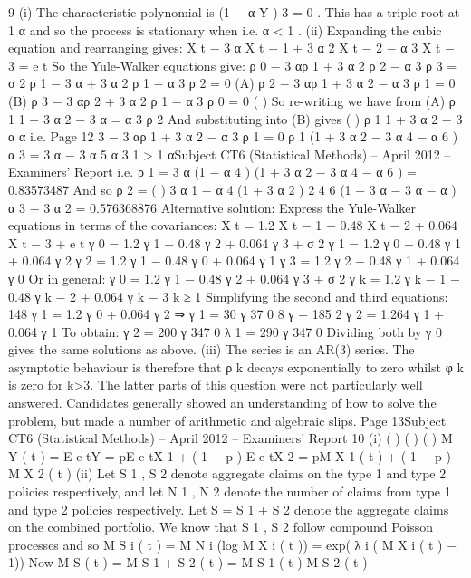 \documentclass[a4paper,12pt]{article}
\begin{document}
\begin{enumerate}
9
(i)
The characteristic polynomial is (1 − α Y ) 3 = 0 .
This has a triple root at 1
α
and so the process is stationary when
i.e. α < 1 .
(ii)
Expanding the cubic equation and rearranging gives:
X t − 3 α X t − 1 + 3 α 2 X t − 2 − α 3 X t − 3 = e t
So the Yule-Walker equations give:
ρ 0 − 3 αρ 1 + 3 α 2 ρ 2 − α 3 ρ 3 = σ 2
ρ 1 − 3 α + 3 α 2 ρ 1 − α 3 ρ 2 = 0 (A)
ρ 2 − 3 αρ 1 + 3 α 2 − α 3 ρ 1 = 0 (B)
ρ 3 − 3 αρ 2 + 3 α 2 ρ 1 − α 3 ρ 0 = 0
(
)
So re-writing we have from (A) ρ 1 1 + 3 α 2 − 3 α = α 3 ρ 2
And substituting into (B) gives
(
)
ρ 1 1 + 3 α 2 − 3 α
α
i.e.
Page 12
3
− 3 αρ 1 + 3 α 2 − α 3 ρ 1 = 0
ρ 1 (1 + 3 α 2 − 3 α 4 − α 6 )
α 3
=
3 α − 3 α 5
α 3
1
> 1
αSubject CT6 (Statistical Methods) – April 2012 – Examiners’ Report
i.e.
ρ 1 =
3 α (1 − α 4 )
(1 + 3 α 2 − 3 α 4 − α 6 )
= 0.83573487
And so
ρ 2 =
(
)
3 α 1 − α 4 (1 + 3 α 2 )
2
4
6
(1 + 3 α − 3 α − α ) α
3
−
3
α 2
= 0.576368876
Alternative solution:
Express the Yule-Walker equations in terms of the covariances:
X t = 1.2 X t − 1 − 0.48 X t − 2 + 0.064 X t − 3 + e t
γ 0 = 1.2 γ 1 − 0.48 γ 2 + 0.064 γ 3 + σ 2
γ 1 = 1.2 γ 0 − 0.48 γ 1 + 0.064 γ 2
γ 2 = 1.2 γ 1 − 0.48 γ 0 + 0.064 γ 1
γ 3 = 1.2 γ 2 − 0.48 γ 1 + 0.064 γ 0
Or in general:
γ 0 = 1.2 γ 1 − 0.48 γ 2 + 0.064 γ 3 + σ 2
γ k = 1.2 γ k − 1 − 0.48 γ k − 2 + 0.064 γ k − 3 k ≥ 1
Simplifying the second and third equations:
148 γ 1 = 1.2 γ 0 + 0.064 γ 2 ⇒ γ 1 =
30 γ
37 0
8 γ
+ 185
2
γ 2 = 1.264 γ 1 + 0.064 γ 1
To obtain:
γ 2 =
200 γ
347 0
λ 1 =
290 γ
347 0
Dividing both by γ 0 gives the same solutions as above.
(iii)
The series is an AR(3) series. The asymptotic behaviour is therefore that ρ k
decays exponentially to zero
whilst φ k is zero for k>3.
The latter parts of this question were not particularly well answered. Candidates generally
showed an understanding of how to solve the problem, but made a number of arithmetic and
algebraic slips.
Page 13Subject CT6 (Statistical Methods) – April 2012 – Examiners’ Report
10
(i)
( )
( )
( )
M Y ( t ) = E e tY = pE e tX 1 + ( 1 − p ) E e tX 2
= pM X 1 ( t ) + ( 1 − p ) M X 2 ( t )
(ii)
Let S 1 , S 2 denote aggregate claims on the type 1 and type 2 policies
respectively, and let N 1 , N 2 denote the number of claims from type 1 and type
2 policies respectively. Let S = S 1 + S 2 denote the aggregate claims on the
combined portfolio. We know that S 1 , S 2 follow compound Poisson processes
and so
M S i ( t ) = M N i (log M X i ( t )) = exp( λ i ( M X i ( t ) − 1))
Now
M S ( t ) = M S 1 + S 2 ( t ) = M S 1 ( t ) M S 2 ( t )

\end{enumerate}
\end{document}
